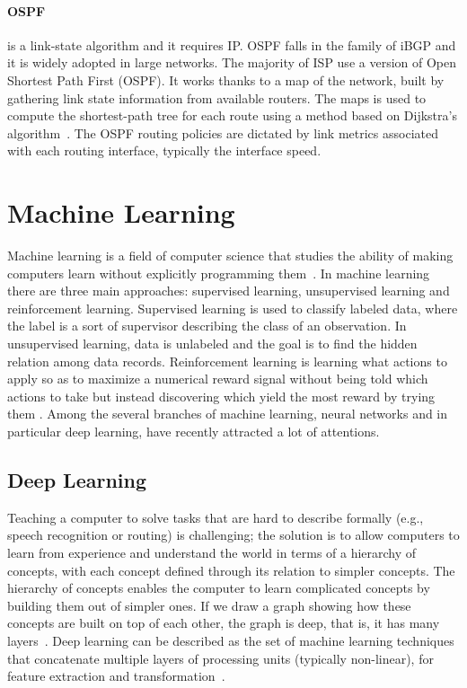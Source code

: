 \paragraph{OSPF} is a link-state algorithm and it requires IP. OSPF falls in the family of iBGP and it is widely adopted in large networks.  The majority of ISP use a version of Open Shortest Path First (OSPF). It works thanks to a map of the network, built by gathering link state information from available routers. The maps is used to compute the shortest-path tree for each route using a method based on Dijkstra's algorithm~\cite{dijkstra1959note}. The OSPF routing policies are dictated by link metrics associated with each routing interface, typically the interface speed.

\section{Machine Learning}
Machine learning is a field of computer science that studies the ability of making computers learn without explicitly programming them~\cite{5392560}. In machine learning there are three main approaches: supervised learning, unsupervised learning and reinforcement learning. Supervised learning is used to classify labeled data, where the label is a sort of supervisor describing the class of an observation. In unsupervised learning, data is unlabeled and the goal is to find the hidden relation among data records. Reinforcement learning is learning what actions to apply so as to maximize a numerical reward signal without being told which actions to take but instead discovering which yield the most reward by trying them \cite{Sutton98reinforcementlearning}. Among the several branches of machine learning, neural networks and in particular deep learning, have recently attracted a lot of attentions.

\subsection{Deep Learning}
Teaching a computer to solve tasks that are hard to describe formally (e.g., speech recognition or routing) is challenging; the solution is to allow computers to learn from experience and understand the world in terms of a hierarchy of concepts, with each concept defined through its relation to simpler concepts. The hierarchy of concepts enables the computer to learn complicated concepts by building them out of simpler ones. If we draw a graph showing how these concepts are built on top of each other, the graph is deep, that is, it has many layers~\cite{Goodfellow-et-al-2016}. Deep learning can be described as the set of machine learning techniques that concatenate multiple layers of processing units (typically non-linear), for feature extraction and transformation~\cite{deep_learning_heterogeneus}. 

